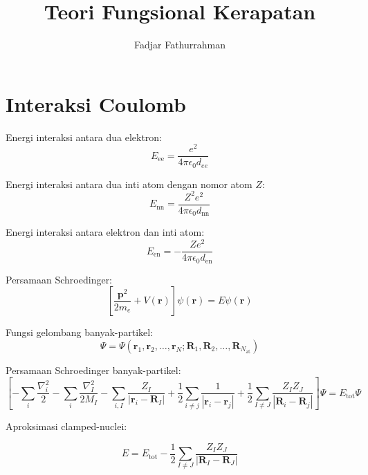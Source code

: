 \documentclass[a4paper,12pt]{article} %
\begin{document}
\title{Teori Fungsional Kerapatan}
\author{Fadjar Fathurrahman}
\date{}
\maketitle

\section{Interaksi Coulomb}

Energi interaksi antara dua elektron:
\begin{equation}
E_{\mathrm{ee}} = \frac{e^2}{4\pi\epsilon_{0}d_{ee}}
\end{equation}

Energi interaksi antara dua inti atom dengan nomor atom $Z$:
\begin{equation}
E_{\mathrm{nn}} = \frac{Z^2e^2}{4\pi\epsilon_{0}d_{\mathrm{nn}}}
\end{equation}

Energi interaksi antara elektron dan inti atom:
\begin{equation}
E_{\mathrm{en}} = -\frac{Ze^2}{4\pi\epsilon_{0}d_{\mathrm{en}}}
\end{equation}

Persamaan Schroedinger:
\begin{equation}
\left[ \frac{\mathbf{p}^2}{2m_{e}} + V(\mathbf{r}) \right] \psi(\mathbf{r}) = E\psi(\mathbf{r})
\end{equation}

Fungsi gelombang banyak-partikel:
\begin{equation}
\Psi =
\Psi\left(\mathbf{r}_{1}, \mathbf{r}_{2}, \ldots, \mathbf{r}_{N};
\mathbf{R}_{1}, \mathbf{R}_{2},\ldots,\mathbf{R}_{N_{\mathrm{at}}}
\right)
\end{equation}

Persamaan Schroedinger banyak-partikel:
\begin{equation}
\left[
-\sum_{i}\frac{\nabla^{2}_{i}}{2} -\sum_{i}\frac{\nabla^{2}_{I}}{2M_{I}}
-\sum_{i,I} \frac{Z_{I}}{\left| \mathbf{r}_{i} - \mathbf{R}_{I} \right|}
+\frac{1}{2}\sum_{i \neq j} \frac{1}{\left| \mathbf{r}_{i} - \mathbf{r}_{j} \right|}
+\frac{1}{2}\sum_{I \neq J} \frac{Z_{I} Z_{J}}{\left| \mathbf{R}_{i} - \mathbf{R}_{j} \right|}
\right] \Psi = E_{\mathrm{tot}} \Psi
\end{equation}

Aproksimasi clamped-nuclei:

\begin{equation}
E = E_{\mathrm{tot}} - \frac{1}{2} \sum_{I \neq J}
\frac{Z_{I} Z_{J}}{\left| \mathbf{R}_{I} - \mathbf{R}_{J} \right|}
\end{equation}
\end{document}
